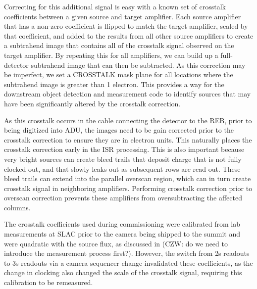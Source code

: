 Correcting for this additional signal is easy with a known set of crosstalk coefficients between a given source and target amplifier. Each source amplifier that has a non-zero coefficient is flipped to match the target amplifier, scaled by that coefficient, and added to the results from all other source amplifiers to create a subtrahend image that contains all of the crosstalk signal observed on the target amplifier.
By repeating this for all amplifiers, we can build up a full-detector subtrahend image that can then be subtracted.
As this correction may be imperfect, we set a CROSSTALK mask plane for all locations where the subtrahend image is greater than 1 electron.
This provides a way for the downstream object detection and measurement code to identify sources that may have been significantly altered by the crosstalk correction.

As this crosstalk occurs in the cable connecting the detector to the REB, prior to being digitized into ADU, the images need to be gain corrected prior to the crosstalk correction to ensure they are in electron units.
This naturally places the crosstalk correction early in the ISR processing. This is also important because very bright sources can create bleed trails that deposit charge that is not fully clocked out, and that slowly leaks out as subsequent rows are read out.
These bleed trails can extend into the parallel overscan region, which can in turn create crosstalk signal in neighboring amplifiers.
Performing crosstalk correction prior to overscan correction prevents these amplifiers from oversubtracting the affected columns.

The crosstalk coefficients used during commissioning were calibrated from lab measurements at SLAC prior to the camera being shipped to the summit and were quadratic with the source flux, as discussed in \citet{2021JATIS...7d48002S} (CZW: do we need to introduce the measurement process first?).
However, the switch from 2s readouts to 3s readouts via a camera sequencer change invalidated these coefficients, as the change in clocking also changed the scale of the crosstalk signal, requiring this calibration to be remeasured.

